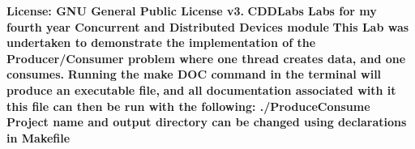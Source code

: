 {\bfseries License\+: G\+NU General Public License v3.} {\bfseries C\+D\+D\+Labs Labs for my fourth year Concurrent and Distributed Devices module} {\bfseries This Lab was undertaken to demonstrate the implementation of the} {\bfseries Producer/\+Consumer problem where one thread creates data, and one consumes.} {\bfseries Running the \textquotesingle{}make D\+OC\textquotesingle{} command in the terminal will produce an executable file,} {\bfseries and all documentation associated with it} {\bfseries this file can then be run with the following\+: ./\+Produce\+Consume} {\bfseries Project name and output directory can be changed using declarations in Makefile} 